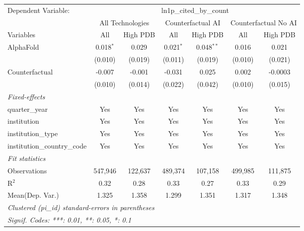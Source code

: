 \begingroup
\centering
\begin{tabular}{lcccccc}
   \tabularnewline \midrule \midrule
   Dependent Variable: & \multicolumn{6}{c}{ln1p\_cited\_by\_count}\\
 & \multicolumn{2}{c}{All Technologies} & \multicolumn{2}{c}{Counterfactual AI} & \multicolumn{2}{c}{Counterfactual No AI} \\
\cmidrule(lr){1-1}\cmidrule(lr){2-3} \cmidrule(lr){4-5} \cmidrule(lr){6-7}
Variables & \multicolumn{1}{c}{All} & \multicolumn{1}{c}{High PDB} & \multicolumn{1}{c}{All} & \multicolumn{1}{c}{High PDB} & \multicolumn{1}{c}{All} & \multicolumn{1}{c}{High PDB} \\
\cmidrule(lr){1-1}\cmidrule(lr){2-2} \cmidrule(lr){3-3} \cmidrule(lr){4-4} \cmidrule(lr){5-5} \cmidrule(lr){6-6} \cmidrule(lr){7-7}
   AlphaFold                    & 0.018$^{*}$ & 0.029   & 0.021$^{*}$ & 0.048$^{**}$ & 0.016   & 0.021\\   
                                & (0.010)     & (0.019) & (0.011)     & (0.019)      & (0.010) & (0.021)\\   
   Counterfactual               & -0.007      & -0.001  & -0.031      & 0.025        & 0.002   & -0.0003\\   
                                & (0.010)     & (0.014) & (0.022)     & (0.042)      & (0.010) & (0.015)\\   
   \midrule
   \emph{Fixed-effects}\\
   quarter\_year                & Yes         & Yes     & Yes         & Yes          & Yes     & Yes\\  
   institution                  & Yes         & Yes     & Yes         & Yes          & Yes     & Yes\\  
   institution\_type            & Yes         & Yes     & Yes         & Yes          & Yes     & Yes\\  
   institution\_country\_code   & Yes         & Yes     & Yes         & Yes          & Yes     & Yes\\  
   \midrule
   \emph{Fit statistics}\\
   Observations                 & 547,946     & 122,637 & 489,374     & 107,158      & 499,985 & 111,875\\  
   R$^2$                        & 0.32        & 0.28    & 0.33        & 0.27         & 0.33    & 0.29\\  
Mean(Dep. Var.) & 1.325 & 1.358 & 1.299 & 1.351 & 1.317 & 1.348 \\
   \midrule \midrule
   \multicolumn{7}{l}{\emph{Clustered (pi\_id) standard-errors in parentheses}}\\
   \multicolumn{7}{l}{\emph{Signif. Codes: ***: 0.01, **: 0.05, *: 0.1}}\\
\end{tabular}
\par\endgroup
